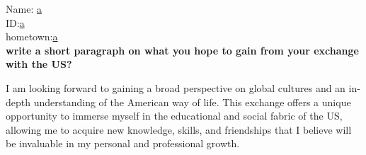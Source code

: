 \documentclass[11pt]{article}
\begin{document}

\vspace{0.5cm}

Name: \underline{a\hspace{2.5in}} \\
ID:\underline{a\hspace{2.5in}}\\
hometown:\underline{a\hspace{2.5in}}\\
\textbf{write a short paragraph on what you hope to gain from your exchange with the US?}

I am looking forward to gaining a broad perspective on global cultures and an in-depth understanding of the American way of life. This exchange offers a unique opportunity to immerse myself in the educational and social fabric of the US, allowing me to acquire new knowledge, skills, and friendships that I believe will be invaluable in my personal and professional growth.
\end{document}
